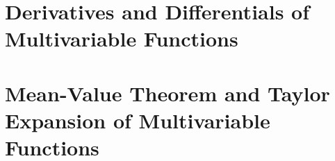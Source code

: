 
\section{Derivatives and Differentials of Multivariable Functions}




\section{Mean-Value Theorem and Taylor Expansion of Multivariable Functions}










